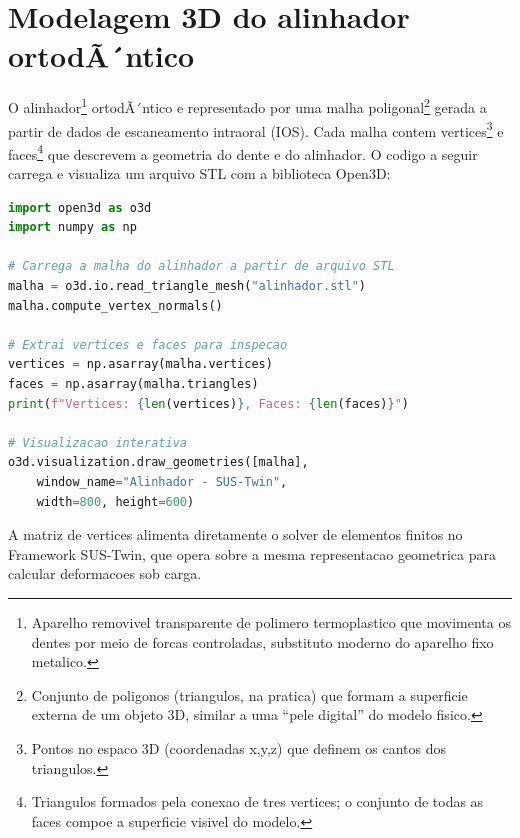 
\label{ch:ortodontia}

\section{Modelagem 3D do alinhador ortodÃ´ntico}

O alinhador\footnote{Aparelho removivel transparente de polimero termoplastico
que movimenta os dentes por meio de forcas controladas, substituto moderno do
aparelho fixo metalico.} ortodÃ´ntico e representado por uma malha poligonal\footnote{Conjunto de poligonos (triangulos, na pratica) que formam a superficie
externa de um objeto 3D, similar a uma ``pele digital'' do modelo fisico.}
gerada a partir de dados de escaneamento intraoral (IOS). Cada malha contem
vertices\footnote{Pontos no espaco 3D (coordenadas x,y,z) que definem os cantos
dos triangulos.} e faces\footnote{Triangulos formados pela conexao de tres
vertices; o conjunto de todas as faces compoe a superficie visivel do modelo.}
que descrevem a geometria do dente e do alinhador. O codigo a seguir carrega
e visualiza um arquivo STL com a biblioteca Open3D:

\begin{lstlisting}[language=Python,caption={Carregamento e visualizacao de
malha 3D de alinhador ortodÃ´ntico com Open3D}]
import open3d as o3d
import numpy as np

# Carrega a malha do alinhador a partir de arquivo STL
malha = o3d.io.read_triangle_mesh("alinhador.stl")
malha.compute_vertex_normals()

# Extrai vertices e faces para inspecao
vertices = np.asarray(malha.vertices)
faces = np.asarray(malha.triangles)
print(f"Vertices: {len(vertices)}, Faces: {len(faces)}")

# Visualizacao interativa
o3d.visualization.draw_geometries([malha],
    window_name="Alinhador - SUS-Twin",
    width=800, height=600)
\end{lstlisting}

A matriz de vertices alimenta diretamente o solver de elementos finitos no
Framework SUS-Twin, que opera sobre a mesma representacao geometrica para
calcular deformacoes sob carga.

